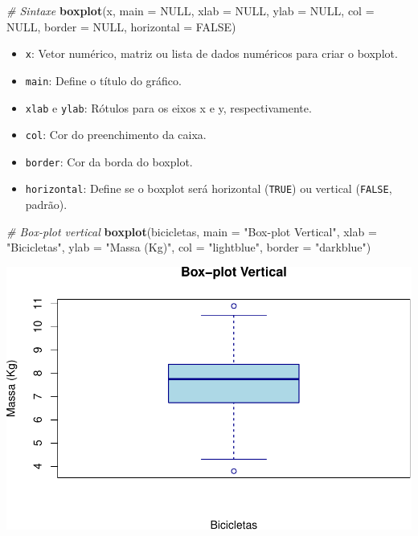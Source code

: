 \documentclass[
]{book}
\newenvironment{Shaded}{\begin{snugshade}}{\end{snugshade}}
\newcommand{\AttributeTok}[1]{\textcolor[rgb]{0.13,0.29,0.53}{#1}}
\newcommand{\CommentTok}[1]{\textcolor[rgb]{0.56,0.35,0.01}{\textit{#1}}}
\newcommand{\ConstantTok}[1]{\textcolor[rgb]{0.56,0.35,0.01}{#1}}
\newcommand{\FunctionTok}[1]{\textcolor[rgb]{0.13,0.29,0.53}{\textbf{#1}}}
\newcommand{\NormalTok}[1]{#1}
\newcommand{\StringTok}[1]{\textcolor[rgb]{0.31,0.60,0.02}{#1}}
\providecommand{\tightlist}{%
  \setlength{\itemsep}{0pt}\setlength{\parskip}{0pt}}
\begin{document}
\begin{Shaded}
\begin{Highlighting}[]
\CommentTok{\# Sintaxe}
\FunctionTok{boxplot}\NormalTok{(x, }
        \AttributeTok{main =} \ConstantTok{NULL}\NormalTok{,}
        \AttributeTok{xlab =} \ConstantTok{NULL}\NormalTok{, }
        \AttributeTok{ylab =} \ConstantTok{NULL}\NormalTok{, }
        \AttributeTok{col =} \ConstantTok{NULL}\NormalTok{, }
        \AttributeTok{border =} \ConstantTok{NULL}\NormalTok{, }
        \AttributeTok{horizontal =} \ConstantTok{FALSE}\NormalTok{)}
\end{Highlighting}
\end{Shaded}

\begin{itemize}
\tightlist
\item
  \texttt{x}: Vetor numérico, matriz ou lista de dados numéricos para criar o boxplot.
\item
  \texttt{main}: Define o título do gráfico.
\item
  \texttt{xlab} e \texttt{ylab}: Rótulos para os eixos x e y, respectivamente.
\item
  \texttt{col}: Cor do preenchimento da caixa.
\item
  \texttt{border}: Cor da borda do boxplot.
\item
  \texttt{horizontal}: Define se o boxplot será horizontal (\texttt{TRUE}) ou vertical (\texttt{FALSE}, padrão).
\end{itemize}

\begin{Shaded}
\begin{Highlighting}[]
\CommentTok{\# Box{-}plot vertical}
\FunctionTok{boxplot}\NormalTok{(bicicletas, }
        \AttributeTok{main =} \StringTok{"Box{-}plot Vertical"}\NormalTok{,}
        \AttributeTok{xlab =} \StringTok{"Bicicletas"}\NormalTok{,}
        \AttributeTok{ylab =} \StringTok{"Massa (Kg)"}\NormalTok{,}
        \AttributeTok{col =} \StringTok{"lightblue"}\NormalTok{,}
        \AttributeTok{border =} \StringTok{"darkblue"}\NormalTok{)}
\end{Highlighting}
\end{Shaded}

\includegraphics{introR_files/figure-latex/unnamed-chunk-174-1.pdf}
\end{document}
